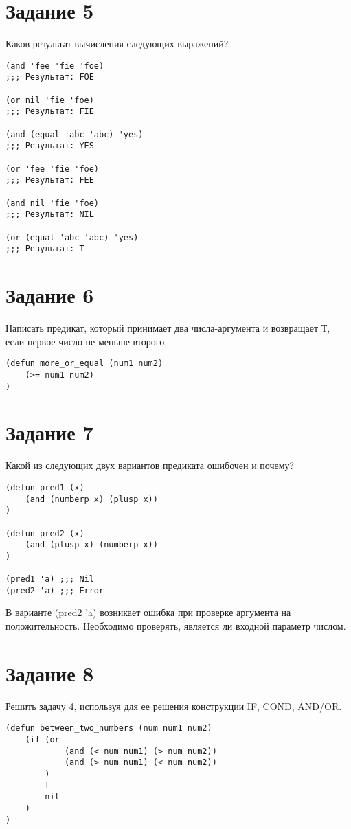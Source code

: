 \section{Задание \No{}5}

Каков результат вычисления следующих выражений?

\begin{lstlisting}
(and 'fee 'fie 'foe)
;;; Результат: FOE

(or nil 'fie 'foe)
;;; Результат: FIE

(and (equal 'abc 'abc) 'yes)
;;; Результат: YES

(or 'fee 'fie 'foe)
;;; Результат: FEE

(and nil 'fie 'foe)
;;; Результат: NIL

(or (equal 'abc 'abc) 'yes)
;;; Результат: T
\end{lstlisting}

\section{Задание \No{}6}

Написать предикат, который принимает два числа-аргумента и возвращает
Т, если первое число не меньше второго.

\begin{lstlisting}
(defun more_or_equal (num1 num2)
    (>= num1 num2)
)
\end{lstlisting}

\section{Задание \No{}7}

Какой из следующих двух вариантов предиката ошибочен и почему?

\begin{lstlisting}
(defun pred1 (x)
    (and (numberp x) (plusp x))
)

(defun pred2 (x)
    (and (plusp x) (numberp x))
)

(pred1 'a) ;;; Nil
(pred2 'a) ;;; Error
\end{lstlisting}

В варианте (pred2 'a) возникает ошибка при проверке аргумента на положительность. Необходимо проверять, является ли входной параметр числом.

\section{Задание \No{}8}

Решить задачу 4, используя для ее решения конструкции
IF, COND, AND/OR.

\begin{lstlisting}
(defun between_two_numbers (num num1 num2)
    (if (or
            (and (< num num1) (> num num2))
            (and (> num num1) (< num num2))
        )
        t
        nil
    )
)
\end{lstlisting}

